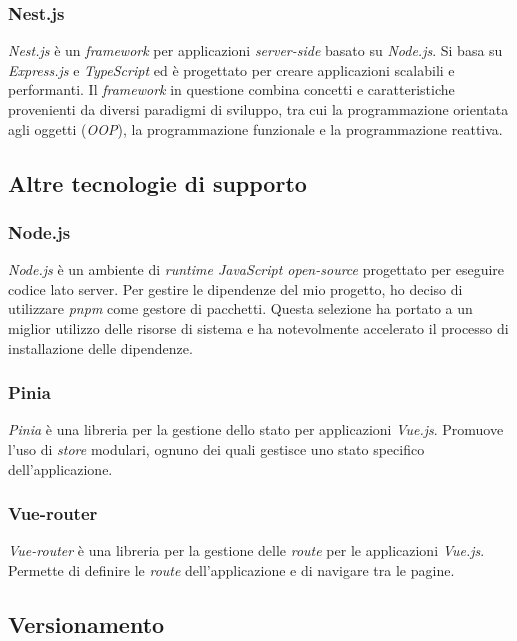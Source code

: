 \subsubsection{Nest.js}\label{subsubsec:nest}
\textit{Nest.js} è un \textit{framework} per applicazioni \textit{server-side} basato su \textit{Node.js}. Si basa su \textit{Express.js} e \textit{TypeScript} ed è progettato per creare applicazioni scalabili e performanti.
Il \textit{framework} in questione combina concetti e caratteristiche provenienti da diversi paradigmi di sviluppo, tra cui la programmazione orientata agli oggetti (\textit{OOP}), la programmazione funzionale e la programmazione reattiva.

\subsection{Altre tecnologie di supporto}\label{subsec:altre-tecnologie-di-supporto}
\subsubsection{Node.js}\label{subsubsec:node.js}
\textit{Node.js} è un ambiente di \textit{runtime JavaScript open-source} progettato per eseguire codice lato server. Per gestire le dipendenze del mio progetto,
ho deciso di utilizzare \textit{pnpm} come gestore di pacchetti. Questa selezione ha portato a un miglior utilizzo delle risorse di sistema e ha notevolmente accelerato il processo di 
installazione delle dipendenze.
 \subsubsection{Pinia}\label{subsubsec:pinia}
 \textit{Pinia} è una libreria per la gestione dello stato per applicazioni \textit{Vue.js}. Promuove l'uso di \textit{store} modulari, ognuno dei quali gestisce uno stato specifico dell'applicazione.
\subsubsection{Vue-router}\label{subsubsec:vue-router}
\textit{Vue-router} è una libreria per la gestione delle \textit{route} per le applicazioni \textit{Vue.js}. Permette di definire le \textit{route} dell'applicazione e di navigare tra le pagine.

\subsection{Versionamento}\label{subsec:versionamento}
